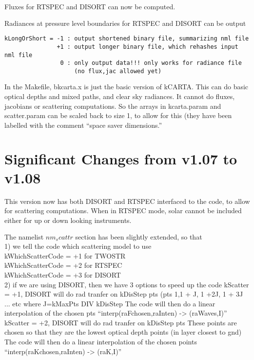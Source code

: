 \documentclass[12pt]{article}
\begin{document}
{{{{Fluxes for RTSPEC and DISORT can now be computed. 
 
Radiances at pressure level boundaries for RTSPEC and DISORT can be output 

\begin{verbatim}
kLongOrShort = -1 : output shortened binary file, summarizing nml file 
               +1 : output longer binary file, which rehashes input nml file 
                0 : only output data!!! only works for radiance file  
                    (no flux,jac allowed yet) 
\end{verbatim}
 
In the Makefile, bkcarta.x is just the basic version of kCARTA. This can do  
basic optical depths and mixed paths, and clear sky radiances. It cannot 
do fluxes, jacobians or scattering computations. So the arrays in kcarta.param 
and scatter.param can be scaled back to size 1, to allow for this (they have
been labelled with the comment ``space saver dimensions.''

\section{Significant Changes from v1.07 to v1.08}
This version now has both DISORT and RTSPEC interfaced to the code, to allow 
for scattering computations. When in RTSPEC mode, solar cannot be included
either for up or down looking instruments. 

The namelist $nm_scattr$ section has been slightly extended, so that \\
  1) we tell the code which scattering model to use\\
          kWhichScatterCode = +1 for TWOSTR\\
          kWhichScatterCode = +2 for RTSPEC\\
          kWhichScatterCode = +3 for DISORT\\

  2) if we are using DISORT, then we have 3 options to speed up the code
       kScatter  = +1, DISORT will do rad tranfer on kDisStep pts 
                        (pts 1,1 + J, 1 +2J, 1 + 3J ... etc where 
                         J=kMaxPts DIV kDisStep
                   The code will then do a linear interpolation of the
                   chosen pts ``interp(raFchosen,raInten) -> (raWaves,I)'' \\
                       
       kScatter  = +2, DISORT will do rad tranfer on kDisStep pts 
                       These points are chosen so that they are the lowest 
                       optical depth points (in layer closest to gnd)
                   The code will then do a linear interpolation of the
                   chosen points ``interp(raKchosen,raInten) -> (raK,I)'' \\

}}}}
\end{document}
